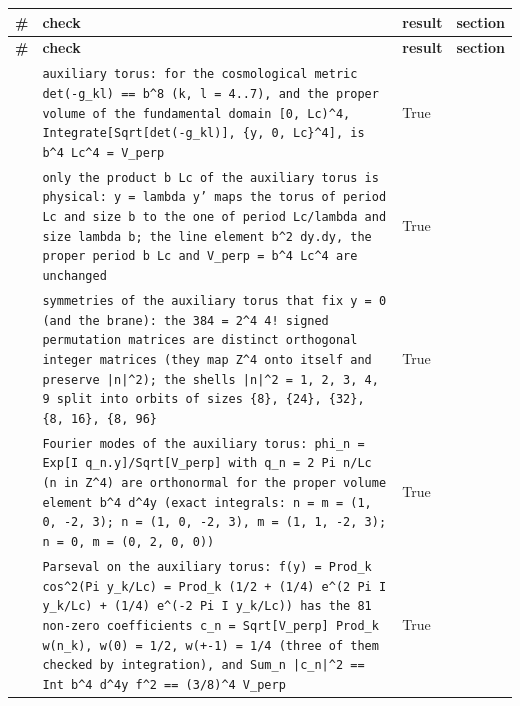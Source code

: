 \documentclass[10pt,a4paper]{article}
\begin{document}
{\footnotesize
\begin{longtable}{>{\raggedright\arraybackslash}p{}>{\raggedright\arraybackslash}p{}>{\raggedright\arraybackslash}p{}>{\raggedright\arraybackslash}p{}}
\toprule
\textbf{\#} & \textbf{check} & \textbf{result} & \textbf{section} \\
\midrule\endfirsthead
\toprule
\textbf{\#} & \textbf{check} & \textbf{result} & \textbf{section} \\
\midrule\endhead
\endfoot
\bottomrule\endlastfoot
1 & \texttt{auxiliary torus: for the cosmological metric det(-g\_\allowbreak{}kl) == b\textasciicircum{}8 (k, l = 4..7), and the proper volume of the fundamental domain [0, Lc)\textasciicircum{}4, Integrate[Sqrt[det(-g\_\allowbreak{}kl)], \{y, 0, Lc\}\textasciicircum{}4], is b\textasciicircum{}4 Lc\textasciicircum{}4 = V\_\allowbreak{}perp} & True & 25.1 \\
2 & \texttt{only the product b Lc of the auxiliary torus is physical: y = lambda y' maps the torus of period Lc and size b to the one of period Lc/\allowbreak{}lambda and size lambda b; the line element b\textasciicircum{}2 dy.dy, the proper period b Lc and V\_\allowbreak{}perp = b\textasciicircum{}4 Lc\textasciicircum{}4 are unchanged} & True & 25.1 \\
3 & \texttt{symmetries of the auxiliary torus that fix y = 0 (and the brane): the 384 = 2\textasciicircum{}4 4! signed permutation matrices are distinct orthogonal integer matrices (they map Z\textasciicircum{}4 onto itself and preserve |n|\textasciicircum{}2); the shells |n|\textasciicircum{}2 = 1, 2, 3, 4, 9 split into orbits of sizes \{8\}, \{24\}, \{32\}, \{8, 16\}, \{8, 96\}} & True & 25.1 \\
4 & \texttt{Fourier modes of the auxiliary torus: phi\_\allowbreak{}n = Exp[I q\_\allowbreak{}n.y]/\allowbreak{}Sqrt[V\_\allowbreak{}perp] with q\_\allowbreak{}n = 2 Pi n/\allowbreak{}Lc (n in Z\textasciicircum{}4) are orthonormal for the proper volume element b\textasciicircum{}4 d\textasciicircum{}4y (exact integrals: n = m = (1, 0, -2, 3); n = (1, 0, -2, 3), m = (1, 1, -2, 3); n = 0, m = (0, 2, 0, 0))} & True & 25.2 \\
5 & \texttt{Parseval on the auxiliary torus: f(y) = Prod\_\allowbreak{}k cos\textasciicircum{}2(Pi y\_\allowbreak{}k/\allowbreak{}Lc) = Prod\_\allowbreak{}k (1/\allowbreak{}2 + (1/\allowbreak{}4) e\textasciicircum{}(2 Pi I y\_\allowbreak{}k/\allowbreak{}Lc) + (1/\allowbreak{}4) e\textasciicircum{}(-2 Pi I y\_\allowbreak{}k/\allowbreak{}Lc)) has the 81 non-zero coefficients c\_\allowbreak{}n = Sqrt[V\_\allowbreak{}perp] Prod\_\allowbreak{}k w(n\_\allowbreak{}k), w(0) = 1/\allowbreak{}2, w(+-1) = 1/\allowbreak{}4 (three of them checked by integration), and Sum\_\allowbreak{}n |c\_\allowbreak{}n|\textasciicircum{}2 == Int b\textasciicircum{}4 d\textasciicircum{}4y f\textasciicircum{}2 == (3/\allowbreak{}8)\textasciicircum{}4 V\_\allowbreak{}perp} & True & 25.2 \\

\end{longtable}}
\end{document}
